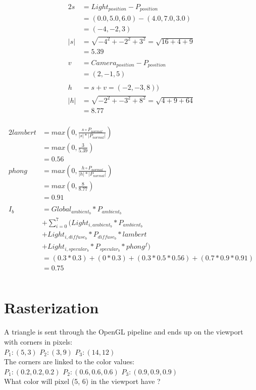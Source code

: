 \documentclass[12pt,fleqn,reqno]{article}
\begin{document}
\begin{alignat*}{2}
	s	&= Light_{position} - P_{position}\\
		&= (0.0, 5.0, 6.0) - (4.0, 7.0, 3.0)\\
		&= (-4, -2, 3)\\
\lvert s\rvert	&= \sqrt{-4^2 + -2^2 + 3^2} = \sqrt{16 + 4 + 9} \\
 			&= 5.39\\
	\\		
	v	&= Camera_{position} - P_{position}\\
		&= (2, -1, 5)\\
	\\
	h		&=  s + v = (-2, -3, 8))\\
\lvert h\rvert	&= \sqrt{-2^2 + -3^2 + 8^2} = \sqrt{4 + 9 + 64} \\
 			&= 8.77\\
\end{alignat*}

\begin{alignat*}{2}
	lambert	&= max(0, \frac{s \circ P_{normal}}{\lvert s\rvert * \lvert  P_{normal}\rvert})\\
			&= max(0, \frac{3}{5.39})\\
			&= 0.56\\
	phong	&= max(0, \frac{h \circ P_{normal}}{\lvert h\rvert * \lvert  P_{normal}\rvert})\\
			&= max(0, \frac{8}{8.77})\\
			&= 0.91\\
		\\
	I_b		&= Global_{ambient_b} * P_{ambient_b}\\
			&+ \sum_{i=0}^{7} (Light_{i,ambient_b} * P_{ambient_b}\\
			&+ Light_{i,diffuse_b} * P_{diffuse_b} * lambert\\
			&+ Light_{i,specular_b} * P_{specular_b} * phong^f)\\
			&= (0.3 * 0.3) +(0 * 0.3) + (0.3 * 0.5 * 0.56) + (0.7 * 0.9 * 0.91)\\
			&= 0.75\\
			\\
\end{alignat*}

\section{Rasterization}
A triangle is sent through the OpenGL pipeline and ends up on the viewport with corners in pixels:\\
\(P_1: (5, 3)\) \quad
\(P_2: (3, 9)\) \quad
\(P_3: (14, 12)\) \\
The corners are linked to the color values: \\
\(P_1 : (0.2, 0.2, 0.2)\) \quad
\(P_2 : (0.6, 0.6, 0.6)\) \quad
\(P_3 : (0.9, 0.9, 0.9)\) \\
What color will pixel (5, 6) in the viewport have ?
\end{document}
